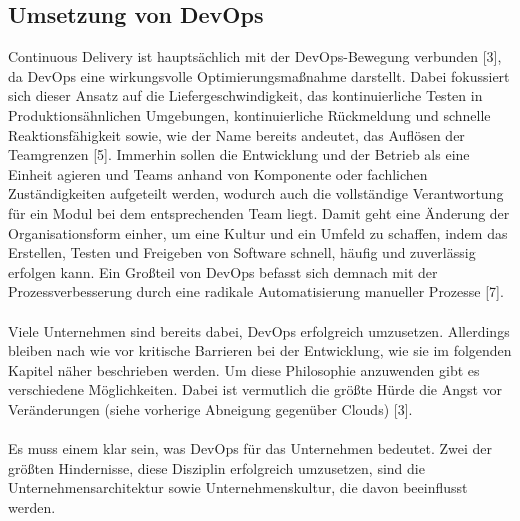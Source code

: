 \subsection{Umsetzung von DevOps}
Continuous Delivery ist hauptsächlich mit der DevOps-Bewegung verbunden [3], da DevOps eine wirkungsvolle Optimierungsmaßnahme darstellt. Dabei fokussiert sich dieser Ansatz auf die Liefergeschwindigkeit, das kontinuierliche Testen in Produktionsähnlichen Umgebungen, kontinuierliche Rückmeldung und schnelle Reaktionsfähigkeit sowie, wie der Name bereits andeutet, das Auflösen der Teamgrenzen [5]. Immerhin sollen die Entwicklung und der Betrieb als eine Einheit agieren und Teams anhand von Komponente oder fachlichen Zuständigkeiten aufgeteilt werden, wodurch auch die vollständige Verantwortung für ein Modul bei dem entsprechenden Team liegt. Damit geht eine Änderung der Organisationsform einher, um eine Kultur und ein Umfeld zu schaffen, indem das Erstellen, Testen und Freigeben von Software schnell, häufig und zuverlässig erfolgen kann. Ein Großteil von DevOps befasst sich demnach mit der Prozessverbesserung durch eine radikale Automatisierung manueller Prozesse [7]. \\ \\
Viele Unternehmen sind bereits dabei, DevOps erfolgreich umzusetzen. Allerdings bleiben nach wie vor kritische Barrieren bei der Entwicklung, wie sie im folgenden Kapitel näher beschrieben werden. Um diese Philosophie anzuwenden gibt es verschiedene Möglichkeiten. Dabei ist vermutlich die größte Hürde die Angst vor Veränderungen (siehe vorherige Abneigung gegenüber Clouds) [3]. \\ \\
Es muss einem klar sein, was DevOps für das Unternehmen bedeutet. Zwei der größten Hindernisse, diese Disziplin erfolgreich umzusetzen, sind die Unternehmensarchitektur sowie Unternehmenskultur, die davon beeinflusst werden.


